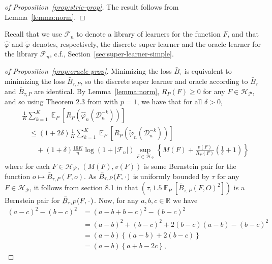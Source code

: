 \documentclass[lineno]{biometrika}
\DeclareMathOperator{\E}{\mathbb{E}} %
\newcommand{\R}{\mathbb{R}}
\newcommand{\blank}{\makebox[1ex]{\textbf{$\cdot$}}}
\renewcommand{\phi}{\varphi}
\newcommand{\1}{\mathds{1}}
\newcommand{\data}{\ensuremath{\mathcal{D}}}
\begin{document}
\begin{proof}[of Proposition~\ref{prop:stric-prop}]
  The result follows from Lemma~\ref{lemma:norm}.
\end{proof}

Recall that we use \( \mathcal{F}_n \) to denote a library of learners for the
function \( F \), and that \( \hat{\phi} \) and \( \tilde{\phi} \) denotes,
respectively, the discrete super learner and the oracle learner for the library
\( \mathcal{F}_n \), c.f., Section~\ref{sec:super-learner-simple}.

\begin{proof}[of Proposition~\ref{prop:oracle-prop}]
  Minimizing the loss \( \bar{B}_{\tau} \) is equivalent to
  minimizing the loss \( \bar{B}_{\tau,P} \), so the discrete super learner and
  oracle according to \( \bar{B}_{\tau} \) and \( \bar{B}_{\tau,P} \) are
  identical. By Lemma~\ref{lemma:norm}, \( R_P(F) \geq 0 \) for any
  \( F \in \mathcal{H}_{\mathcal{P}} \), and so using Theorem 2.3 from
  \citep{vaart2006oracle} with \( p=1 \), we have that for all \( \delta >0 \),
\begin{align*}
  & \frac{1}{K} \sum_{k=1}^{K} \E_{P}{\left[ R_P(\hat{\phi}_n(\data_n^{-k})) \right]}
  \\
  &  \quad \leq
    (1+2\delta)\frac{1}{K} \sum_{k=1}^{K}\E_{P}{\left[ R_P(\tilde{\phi}_n(\data_n^{-k})) \right]}
  \\
  & \qquad + (1+\delta) \frac{16 K}{n}
    \log(1 + |\mathcal{F}_n|)\sup_{F \in \mathcal{H}_{\mathcal{P}}}
    \left\{
    M(F) + \frac{v(F)}{R_P(F)}
    \left(
    \frac{1}{\delta} + 1
    \right)
    \right\}
\end{align*}
where for each \( F \in \mathcal{H}_{\mathcal{P}} \),
\( (M(F), v(F)) \) is some Bernstein pair for the function
\(o \mapsto \bar{B}_{\tau,P}(F, o) \). As
\( \bar{B}_{\tau,P}(F, \blank) \) is uniformly bounded by \( \tau \)
for any \( F \in \mathcal{H}_{\mathcal{P}} \), it follows from section
8.1 in \citep{vaart2006oracle} that
\( (\tau, 1.5 \E_P{[\bar{B}_{\tau,P}(F, O)^2]}) \) is a Bernstein
pair for \( \bar{B}_{\tau,P}(F, \blank) \). Now, for any
\( a,b,c \in \R \) we have
\begin{align*}
  (a-c)^2 - (b-c)^2
  & = (a-b+b-c)^2 - (b-c)^2
  \\
  & = (a-b)^2 + (b-c)^2 +2(b-c)(a-b) - (b-c)^2
  \\
  & = (a-b)
    \left\{
    (a-b) +  2(b-c)
    \right\}
  \\
  & = (a-b)
    \left\{
     a + b -2c
    \right\},
\end{align*}

\end{proof}
\end{document}
